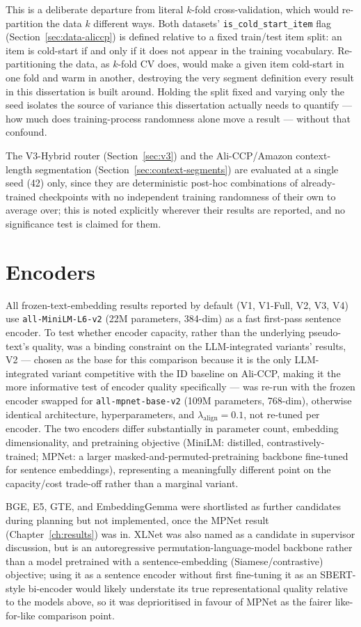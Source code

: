 This is a deliberate departure from literal $k$-fold cross-validation, which would re-partition the data $k$ different ways. Both datasets' \texttt{is\_cold\_start\_item} flag (Section~\ref{sec:data-aliccp}) is defined relative to a fixed train/test item split: an item is cold-start if and only if it does not appear in the training vocabulary. Re-partitioning the data, as $k$-fold CV does, would make a given item cold-start in one fold and warm in another, destroying the very segment definition every result in this dissertation is built around. Holding the split fixed and varying only the seed isolates the source of variance this dissertation actually needs to quantify --- how much does training-process randomness alone move a result --- without that confound.

The V3-Hybrid router (Section~\ref{sec:v3}) and the Ali-CCP/Amazon context-length segmentation (Section~\ref{sec:context-segments}) are evaluated at a single seed (42) only, since they are deterministic post-hoc combinations of already-trained checkpoints with no independent training randomness of their own to average over; this is noted explicitly wherever their results are reported, and no significance test is claimed for them.

\section{Encoders}
\label{sec:encoders}

All frozen-text-embedding results reported by default (V1, V1-Full, V2, V3, V4) use \texttt{all-MiniLM-L6-v2} \cite{reimers2019sbert} (22M parameters, 384-dim) as a fast first-pass sentence encoder. To test whether encoder capacity, rather than the underlying pseudo-text's quality, was a binding constraint on the LLM-integrated variants' results, V2 --- chosen as the base for this comparison because it is the only LLM-integrated variant competitive with the ID baseline on Ali-CCP, making it the more informative test of encoder quality specifically --- was re-run with the frozen encoder swapped for \texttt{all-mpnet-base-v2} \cite{song2020mpnet} (109M parameters, 768-dim), otherwise identical architecture, hyperparameters, and $\lambda_{\text{align}}=0.1$, not re-tuned per encoder. The two encoders differ substantially in parameter count, embedding dimensionality, and pretraining objective (MiniLM: distilled, contrastively-trained; MPNet: a larger masked-and-permuted-pretraining backbone fine-tuned for sentence embeddings), representing a meaningfully different point on the capacity/cost trade-off rather than a marginal variant.

BGE, E5, GTE, and EmbeddingGemma were shortlisted as further candidates during planning but not implemented, once the MPNet result (Chapter~\ref{ch:results}) was in. XLNet \cite{yang2019xlnet} was also named as a candidate in supervisor discussion, but is an autoregressive permutation-language-model backbone rather than a model pretrained with a sentence-embedding (Siamese/contrastive) objective; using it as a sentence encoder without first fine-tuning it as an SBERT-style bi-encoder would likely understate its true representational quality relative to the models above, so it was deprioritised in favour of MPNet as the fairer like-for-like comparison point.
